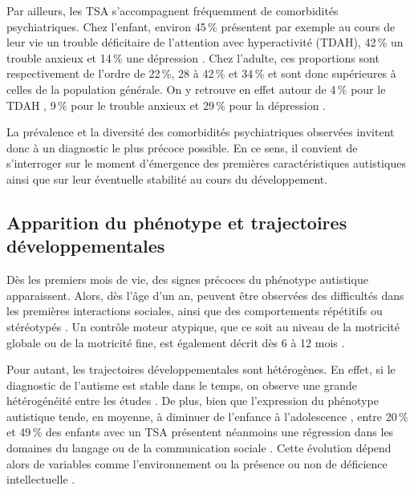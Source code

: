 Par ailleurs, les TSA s'accompagnent fréquemment de comorbidités psychiatriques. Chez l'enfant, environ 45\,\% présentent par exemple au cours de leur vie un trouble déficitaire de l'attention avec hyperactivité (TDAH), 42\,\% un trouble anxieux et 14\,\% une dépression \parencite{Micai2023Dec}. Chez l'adulte, ces proportions sont respectivement de l'ordre de 22\,\%, 28 à 42\,\% et 34\,\% \parencite{hollocks_anxiety_2019, Micai2023Dec} et sont donc supérieures à celles de la population générale. On y retrouve en effet autour de 4\,\% pour le TDAH \parencite{Popit2024Oct, Song2021Feb}, 9\,\% pour le trouble anxieux \parencite{Kessler2012Aug} et 29\,\% pour la dépression \parencite{Kessler2012Aug, Hu2022May}.

\medskip

La prévalence et la diversité des comorbidités psychiatriques observées invitent donc à un diagnostic le plus précoce possible. En ce sens, il convient de s'interroger sur le moment d'émergence des premières caractéristiques autistiques ainsi que sur leur éventuelle stabilité au cours du développement.

\subsection{Apparition du phénotype et trajectoires développementales}
Dès les premiers mois de vie, des signes précoces du phénotype autistique apparaissent. Alors, dès l'âge d'un an, peuvent être observées des difficultés dans les premières interactions sociales, ainsi que des comportements répétitifs ou stéréotypés \parencite{Webb2009Apr,Tanner2021Mar,Zwaigenbaum2015Oct}. Un contrôle moteur atypique, que ce soit au niveau de la motricité globale ou de la  motricité fine, est également décrit dès 6 à 12 mois \parencite{Estes2015Jul,Zwaigenbaum2015Oct}. 

Pour autant, les trajectoires développementales sont hétérogènes. En effet, si le diagnostic de l'autisme est stable dans le temps, on observe une grande hétérogénéité entre les études \parencite{Bieleninik2017Sep}. De plus, bien que l'expression du phénotype autistique tende, en moyenne, à diminuer de l'enfance à l'adolescence \parencite{Waizbard-Bartov2022Nov}, entre 20\,\% et 49\,\% des enfants avec un TSA présentent néanmoins une régression dans les domaines du langage ou de la communication sociale \parencite{Webb2009Apr}. Cette évolution dépend alors de variables comme l'environnement ou la présence ou non de déficience intellectuelle \parencite{Waizbard-Bartov2022Nov}.

